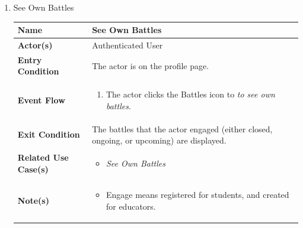 \begin{enumerate}
\item See Own Battles
\begin{center}
    \begin{tabular}{ | m{10em} | m{10cm}| } 
      \hline
      \textbf{Name} & See Own Battles  \\ 
      \hline
      \textbf{Actor(s)} & Authenticated User \\ 
      \hline
      \textbf{Entry Condition} & The actor is on the profile page. \\ 
      \hline
      \textbf{Event Flow} & 
          \begin{enumerate}[(1)]
              \item The actor clicks the Battles icon to \textit{to see own battles}.
          \end{enumerate}
      \\ 
      \hline
      \textbf{Exit Condition} &  The battles that the actor engaged (either closed, ongoing, or upcoming) are displayed.  \\ 
      \hline
      \textbf{Related Use Case(s)} & 
      \begin{itemize}
          \item \textit{See Own Battles}
      \end{itemize}
          \\ 
      \hline
      \textbf{Note(s)} & 
      \begin{itemize}
          \item Engage means registered for students, and created for educators.
      \end{itemize}
          \\ 
      \hline
    \end{tabular}
     \label{tbl:uc17}
\end{center}

\newpage


\end{enumerate}
